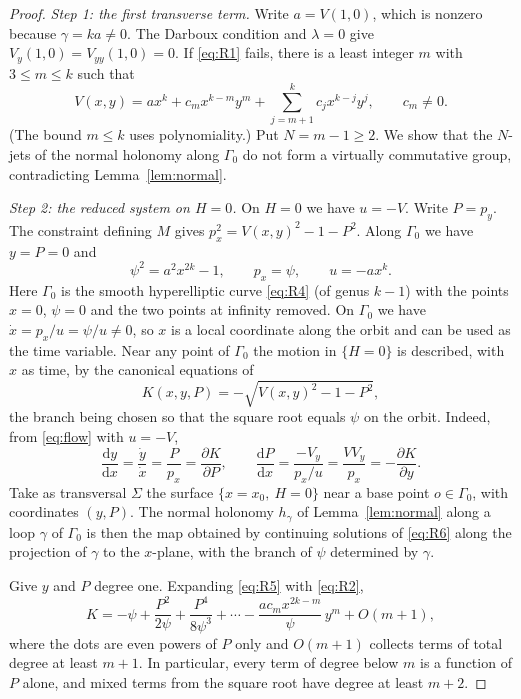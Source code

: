 \documentclass[11pt]{article}
\numberwithin{equation}{section}
\theoremstyle{definition}
\theoremstyle{remark}
\newcommand{\dd}{\mathrm d}
\begin{document}
\begin{proof}
\emph{Step 1: the first transverse term.} Write $a=V(1,0)$, which is nonzero because $\gamma=ka\ne0$. The Darboux
condition and $\lambda=0$ give $V_y(1,0)=V_{yy}(1,0)=0$. If \eqref{eq:R1} fails, there is a least integer $m$ with
$3\le m\le k$ such that
\begin{equation}\label{eq:R2}
V(x,y)=a x^k+c_m x^{k-m}y^m+\sum_{j=m+1}^{k}c_j x^{k-j}y^j,\qquad c_m\ne0 .
\end{equation}
(The bound $m\le k$ uses polynomiality.) Put $N=m-1\ge2$. We show that the $N$-jets of the normal holonomy along
$\Gamma_0$ do not form a virtually commutative group, contradicting Lemma~\ref{lem:normal}.

\emph{Step 2: the reduced system on $H=0$.} On $H=0$ we have $u=-V$. Write $P=p_y$. The constraint defining $M$ gives
$p_x^2=V(x,y)^2-1-P^2$. Along $\Gamma_0$ we have $y=P=0$ and
\begin{equation}\label{eq:R4}
\psi^2=a^2x^{2k}-1,\qquad p_x=\psi,\qquad u=-a x^k .
\end{equation}
Here $\Gamma_0$ is the smooth hyperelliptic curve \eqref{eq:R4} (of genus $k-1$) with the points $x=0$, $\psi=0$ and
the two points at infinity removed. On $\Gamma_0$ we have $\dot x=p_x/u=\psi/u\ne0$, so $x$ is a local coordinate along
the orbit and can be used as the time variable. Near any point of $\Gamma_0$ the motion in $\{H=0\}$ is described, with
$x$ as time, by the canonical equations of
\begin{equation}\label{eq:R5}
K(x,y,P)=-\sqrt{V(x,y)^2-1-P^2},
\end{equation}
the branch being chosen so that the square root equals $\psi$ on the orbit. Indeed, from \eqref{eq:flow} with
$u=-V$,
\begin{equation}\label{eq:R6}
\frac{\dd y}{\dd x}=\frac{\dot y}{\dot x}=\frac{P}{p_x}=\frac{\partial K}{\partial P},\qquad
\frac{\dd P}{\dd x}=\frac{-V_y}{p_x/u}=\frac{VV_y}{p_x}=-\frac{\partial K}{\partial y}.
\end{equation}
Take as transversal $\Sigma$ the surface $\{x=x_0,\ H=0\}$ near a base point $o\in\Gamma_0$, with coordinates
$(y,P)$. The normal holonomy $h_\gamma$ of Lemma~\ref{lem:normal} along a loop $\gamma$ of $\Gamma_0$ is then the map
obtained by continuing solutions of \eqref{eq:R6} along the projection of $\gamma$ to the $x$-plane, with the branch of
$\psi$ determined by $\gamma$.

Give $y$ and $P$ degree one. Expanding \eqref{eq:R5} with \eqref{eq:R2},
\begin{equation}\label{eq:R7}
K=-\psi+\frac{P^2}{2\psi}+\frac{P^4}{8\psi^3}+\cdots-\frac{a c_m x^{2k-m}}{\psi}\,y^m+O(m+1),
\end{equation}
where the dots are even powers of $P$ only and $O(m+1)$ collects terms of total degree at least $m+1$. In particular,
every term of degree below $m$ is a function of $P$ alone, and mixed terms from the square root have degree at least
$m+2$.


\end{proof}
\end{document}
